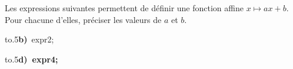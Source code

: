 \documentclass[exercice]{thedocument}%
\begin{document}
%
Les expressions suivantes permettent de définir une fonction affine
$x\mapsto ax+b$. Pour chacune d'elles, préciser les valeurs de $a$ et $b$.\par\medskip
\hbox{\hbox to.5\hbox{{\bfseries b)} \<expr2;\hfill}}\par\medskip
\hbox{\hbox to.5\hbox{{\bfseries d) \<expr4;}\hfill}}
\end{document}
